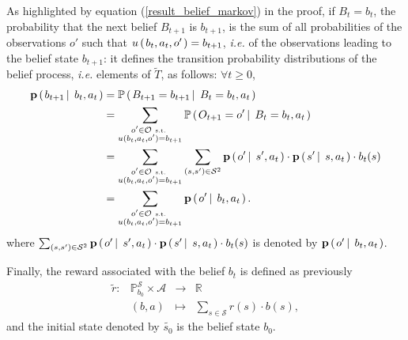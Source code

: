 As highlighted by equation (\ref{result_belief_markov}) in the proof, 
if $B_t=b_t$, the probability that the next belief $B_{t+1}$ is $b_{t+1}$, 
is the sum of all probabilities of the observations $o'$
such that $u \left( \left. b_t,a_t,o' \right. \right)=b_{t+1}$, \textit{i.e.}
of the observations leading to the belief state $b_{t+1}$: 
it defines the transition probability distributions of the belief process,
\textit{i.e.} elements of $\tilde{T}$, as follows: $\forall t \geqslant 0$,
\begin{align}
\nonumber \textbf{p} \left( \left.  b_{t+1} \, \right| \left. \, b_t,a_t \right. \right) &= \mathbb{P} \left( \left.  B_{t+1} = b_{t+1} \, \right| \left. \, B_t=b_t, a_t  \right. \right) \\
\nonumber &= \sum_{\substack{ o' \in \mathcal{O} \mbox{ \tiny s.t. } \\ u(b_t,a_{t},o') = b_{t+1}} } \mathbb{P} \left( \left.  O_{t+1} = o' \, \right| \left. \, B_t=b_t, a_t \right. \right) \\
\label{belief_transition} &= \sum_{ \substack{ o' \in \mathcal{O} \mbox{ \tiny s.t. } \\ u(b_t,a_t,o') = b_{t+1}} } \sum_{(s,s') \in \mathcal{S}^2}\textbf{p} \left( \left.  o' \, \right| \left. \, s', a_t  \right. \right) \cdot \textbf{p} \left( \left.  s' \, \right| \left. \, s, a_t  \right. \right) \cdot b_t(s)\\
\nonumber &= \sum_{ \substack{ o' \in \mathcal{O} \mbox{ \tiny s.t. } \\ u(b_t,a_t,o') = b_{t+1}} } \textbf{p} \left( \left.  o' \, \right| \left. \, b_t, a_t  \right. \right).
\end{align}
where $\sum_{(s,s') \in \mathcal{S}^2}\textbf{p} \left( \left.  o' \, \right| \left. \, s', a_t  \right. \right) \cdot \textbf{p} \left( \left.  s' \, \right| \left. \, s, a_t  \right. \right) \cdot b_t(s)$ is denoted by 
$\textbf{p} \left( \left.  o' \, \right| \left. \, b_t, a_t  \right. \right)$.

Finally, the reward associated with the belief $b_t$ is defined as previously
\begin{equation}
\label{belief_reward} \begin{array}{ccccc} \tilde{r}: & \mathbb{P}^{\mathcal{S}}_{b_0}  \times \mathcal{A} & \rightarrow & \mathbb{R} \\ 
						& (b,a) & \mapsto & \sum_{s \in \mathcal{S}} r(s) \cdot b(s),
\end{array}
\end{equation} 
and the initial state denoted by $\tilde{s_0}$ is the belief state $b_0$.

